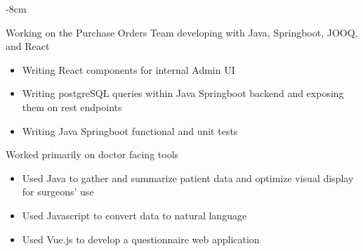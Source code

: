\documentclass[10pt,letterpaper]{altacv}
\begin{document}
\photo{6cm}{}

\begin{adjustwidth}{}{-8cm}
\makecvheader
\end{adjustwidth}




{Working on the Purchase Orders Team developing with Java, Springboot, JOOQ, and React
\begin{itemize}
\item Writing React components for internal Admin UI
\item Writing postgreSQL queries within Java Springboot backend and exposing them on rest endpoints
\item Writing Java Springboot functional and unit tests
\end{itemize}}

{Worked primarily on doctor facing tools
\begin{itemize}
\item Used Java to gather and summarize patient data and optimize visual display for surgeons’ use
\item Used Javascript to convert data to natural language
\item Used Vue.js to develop a questionnaire web application
\end{itemize}}
\end{document}
